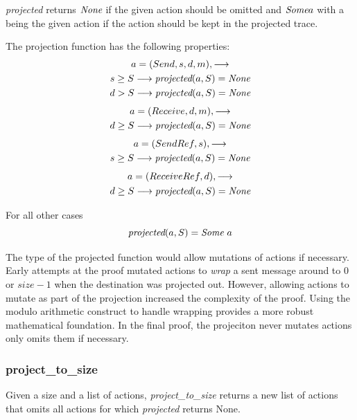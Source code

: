 \documentclass[runningheads]{llncs}
\begin{document}
\emph{projected} returns $\emph{None}$ if the given action should be omitted and $\emph{Some} a$ with a being the given action if the action should be kept in the projected trace.

The projection function has the following properties:
\begin{multline*}
a = (Send, s, d, m), \longrightarrow \\
s \ge S \longrightarrow \emph{projected}(a, S) = \emph{None} \\
d > S \longrightarrow \emph{projected}(a, S) = \emph{None} \\
\end{multline*}
\begin{multline*}
a = (Receive, d, m), \longrightarrow \\
d \ge S \longrightarrow \emph{projected}(a, S) = \emph{None} \\
\end{multline*}
\begin{multline*}
a = (SendRef, s), \longrightarrow \\
s \ge S \longrightarrow \emph{projected}(a, S) = \emph{None} \\
\end{multline*}
\begin{multline*}
a = (ReceiveRef, d), \longrightarrow \\
d \ge S \longrightarrow \emph{projected}(a, S) = \emph{None} \\
\end{multline*}

For all other cases 
$$\emph{projected}(a, S) = \emph{Some}\ a$$


The type of the projected function would allow mutations of actions if necessary. Early attempts at the proof mutated actions to \emph{wrap} a sent message around to $0$ or $size-1$ when the destination was projected out. However, allowing actions to mutate as part of the projection increased the complexity of the proof. Using the modulo arithmetic construct to handle wrapping provides a more robust mathematical foundation. In the final proof, the projeciton never mutates actions only omits them if necessary. 

\subsubsection{project\_to\_size} 
Given a size and a list of actions, \emph{project\_to\_size} returns a new list of actions that omits all actions for which \emph{projected} returns None. 
\end{document}
